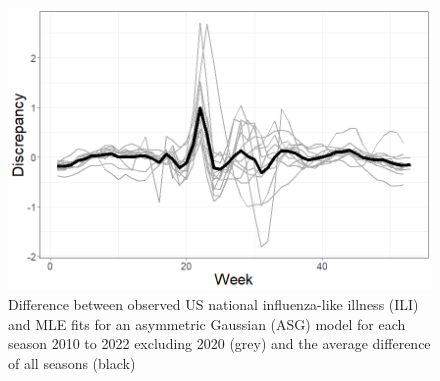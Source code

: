 \begin{figure}[hbt!]
    \centering
    \includegraphics[scale=.45]{Images/discrepancy.png}
    \caption{Difference between observed US national influenza-like illness 
    (ILI) and MLE fits for an asymmetric Gaussian (ASG) model for each season 
    2010 to 2022 excluding 2020 (grey) and the average difference of all 
    seasons (black)}
    \label{fig:discrepancy}
\end{figure}

